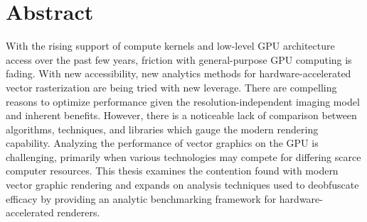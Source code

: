 \section*{Abstract}

With the rising support of compute kernels and low-level GPU architecture access over the past few years, friction with general-purpose GPU computing is fading. With new accessibility, new analytics methods for hardware-accelerated vector rasterization are being tried with new leverage. There are compelling reasons to optimize performance given the resolution-independent imaging model and inherent benefits. However, there is a noticeable lack of comparison between algorithms, techniques, and libraries which gauge the modern rendering capability. Analyzing the performance of vector graphics on the GPU is challenging, primarily when various technologies may compete for differing scarce computer resources. This thesis examines the contention found with modern vector graphic rendering and expands on analysis techniques used to deobfuscate efficacy by providing an analytic benchmarking framework for hardware-accelerated renderers.